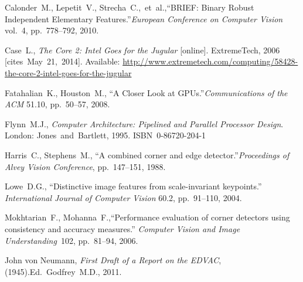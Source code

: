 {\raggedright
	\begin{thebibliography}{99}
		
			Calonder~M., Lepetit~V., Strecha~C.,~et~al.,\linebreak[1]
			``BRIEF: Binary Robust Independent Elementary Features.''\linebreak[1]
			\textit{European Conference on Computer Vision} vol.~4, pp.~778--792,
			2010.
		
			Case~L.,
			\textit{The Core 2: Intel Goes for the Jugular} [online].
			ExtremeTech, 2006 [cites~May~21,~2014].
			Available: \url{http://www.extremetech.com/computing/58428-the-core-2-intel-goes-for-the-jugular}
		
			Fatahalian~K., Houston~M.,
			``A Closer Look at GPUs.''\linebreak[1]
			\textit{Communications of the ACM} 51.10, pp.~50--57, 2008.
		
			Flynn~M.J.,
			\textit{Computer Architecture: Pipelined and Parallel Processor Design}.
			\linebreak[3]
			London: Jones~and~Bartlett, 1995. ISBN~0-86720-204-1
		
			Harris~C., Stephens~M.,
			``A combined corner and edge detector.''\linebreak[1]
			\textit{Proceedings of Alvey Vision Conference}, pp.~147--151, 1988.
		
		
			Lowe~D.G.,
			``Distinctive image features from scale-invariant keypoints.''
			\textit{International Journal of Computer Vision} 60.2,
			pp.~91--110, 2004.
		
			Mokhtarian~F., Mohanna~F.,\linebreak[1]
			``Performance evaluation of corner detectors using
			consistency and accuracy measures.''
			\textit{Computer Vision and Image Understanding}~102, pp.~81--94, 2006.
		
			John von Neumann,
			\textit{First Draft of a Report on the EDVAC}, (1945).\linebreak[2]
			Ed.~Godfrey~M.D., 2011.
		

\end{thebibliography}}

